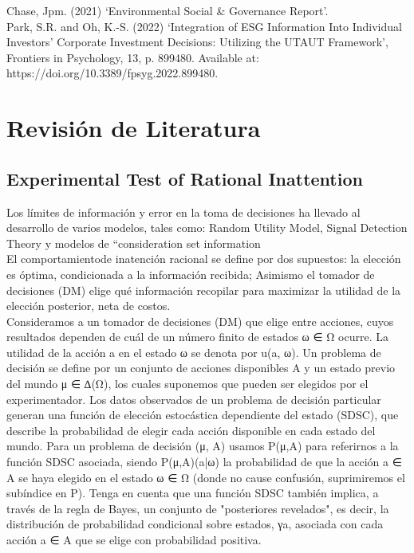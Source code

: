 \documentclass[11pt,letterpaper]{article}
\begin{document}
\noindent Chase, Jpm. (2021) ‘Environmental Social & Governance Report’.\\

\noindent Park, S.R. and Oh, K.-S. (2022) ‘Integration of ESG Information Into Individual Investors’ Corporate Investment Decisions: Utilizing the UTAUT Framework’, Frontiers in Psychology, 13, p. 899480. Available at: https://doi.org/10.3389/fpsyg.2022.899480.\\



\section{Revisión de Literatura}


\subsection{Experimental Test of Rational Inattention}

Los límites de información y error en la toma de decisiones ha llevado al desarrollo de varios modelos, tales como: Random Utility Model, Signal Detection Theory y modelos de “consideration set information\\

El comportamientode inatención racional se define por dos supuestos: la elección es óptima, condicionada a la información recibida; Asimismo el tomador de decisiones (DM) elige qué información recopilar para maximizar la utilidad de la elección posterior, neta de costos.\\

Consideramos a un tomador de decisiones (DM) que elige entre acciones, cuyos resultados dependen de cuál de un número finito de estados ω ∈ Ω ocurre. La utilidad de la acción a en el estado ω se denota por u(a, ω). Un problema de decisión se define por un conjunto de acciones disponibles A y un estado previo del mundo μ ∈ ∆(Ω), los cuales suponemos que pueden ser elegidos por el experimentador. Los datos observados de un problema de decisión particular generan una función de elección estocástica dependiente del estado (SDSC), que describe la probabilidad de elegir cada acción disponible en cada estado del mundo. Para un problema de decisión (μ, A) usamos P(μ,A) para referirnos a la función SDSC asociada, siendo P(μ,A)(a|ω) la probabilidad de que la acción a ∈ A se haya elegido en el estado ω ∈ Ω (donde no cause confusión, suprimiremos el subíndice en P). Tenga en cuenta que una función SDSC también implica, a través de la regla de Bayes, un conjunto de "posteriores revelados", es decir, la distribución de probabilidad condicional sobre estados, γa, asociada con cada acción a ∈ A que se elige con probabilidad positiva.\\
\end{document}
